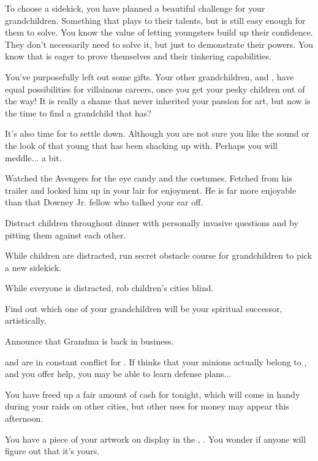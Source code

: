 \documentclass[char]{LRSguildcamp1}
\begin{document}
To choose a sidekick, you have planned a beautiful challenge for your grandchildren. Something that plays to their talents, but is still easy enough for them to solve. You know the value of letting youngsters build up their confidence. They don't necessarily need to solve it, but just to demonstrate their powers. You know that \cTeen{} is eager to prove themselves and their tinkering capabilities. 

You've purposefully left out some gifts. Your other grandchildren, \cGrad{} and \cTween{}, have equal possibilities for villainous careers, once you get your pesky children out of the way! It is really a shame that \cYoungest {} never inherited your passion for art, but now is the time to find a grandchild that has? 

It's also time for \cYoungest {} to settle down. Although you are not sure you like the sound or the look of that young \cYS{\hero} that \cYoungest{} has been shacking up with. Perhaps you will meddle... a bit. 

Watched the Avengers for the eye candy and the costumes. Fetched \cChrisHemsworth{\intro} from his trailer and locked him up in your lair for enjoyment. He is far more enjoyable than that Downey Jr. fellow who talked your ear off. 

\begin{itemz}[Goals]
	\item Distract children throughout dinner with personally invasive questions and by pitting them against each other. 
	\item While children are distracted, run secret obstacle course for grandchildren to pick a new sidekick. 
	\item While everyone is distracted, rob children's cities blind. 
	\item Find out which one of your grandchildren will be your spiritual successor, artistically. 
	\item Announce that Grandma is back in business. 
	
\end{itemz}

\begin{itemz}[Notes]

	\item \cOldest{} and \cOS{} are in constant conflict for \pCityO{}.  If \cOldest{} thinks that your minions actually belong to \cOS{}, and you offer help, you may be able to learn \cOldest{\their} defense plans...
	\item You have freed up a fair amount of cash for tonight, which will come in handy during your raids on other cities, but other uses for money may appear this afternoon.
	
	\item You have a piece of your artwork on display in the \sArtRoom{}, \iArtworkTwo{}. You wonder if anyone will figure out that it's yours. 

\end{itemz}
\end{document}
